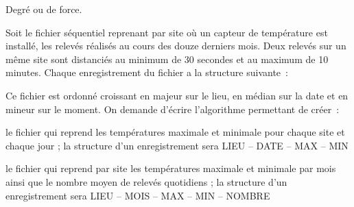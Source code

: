 \begin{Exercice}{Degré ou de force.}

	Soit le fichier séquentiel  reprenant par site où un capteur de
	température est installé, les relevés réalisés au cours des douze
	derniers mois. Deux relevés sur un même site sont distanciés au minimum
	de 30 secondes et au maximum de 10 minutes. Chaque enregistrement du
	fichier a la structure  suivante~:

	
	Ce fichier est ordonné croissant en majeur sur le lieu, en médian sur la
	date et en mineur sur le moment. On demande d’écrire l’algorithme
	permettant de créer~:

	\begin{liste}
		\item 
			le fichier  qui reprend les températures maximale et minimale
			pour chaque site et chaque jour ; la structure d’un enregistrement sera
			LIEU – DATE – MAX – MIN
		\item 
			le fichier  qui reprend par site les températures maximale et
			minimale par mois ainsi que le nombre moyen de relevés quotidiens ; la
			structure d’un enregistrement sera LIEU – MOIS – MAX – MIN – NOMBRE
	\end{liste}
\end{Exercice}

